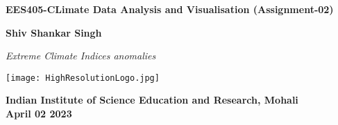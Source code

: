 \documentclass[a4paper, 12pt, twoside]{report}
\begin{document}
\date{}

\thispagestyle{empty}

\begin{titlepage}

    \begin{center}
        \LARGE
        \textbf{EES405-CLimate Data Analysis and Visualisation (Assignment-02)}

        \vspace{1cm}


        \vspace{1cm}
        \Large
        \textbf{Shiv Shankar Singh}
        \vspace{1cm}

        \large
        \textit{Extreme Climate Indices anomalies}

        \vspace{2cm}

        \texttt{[image: HighResolutionLogo.jpg]}

        \vspace{1cm}

        \large
        \textbf{Indian Institute of Science Education and Research, Mohali}\\
        \vspace{0.5cm}
        \large
        \textbf{April 02 2023}
    \end{center}


\end{titlepage}

\thispagestyle{empty}
\cleardoublepage




\newpage
\restoregeometry

\listoffigures

\newpage

\listoftables

\tableofcontents
\end{document}
